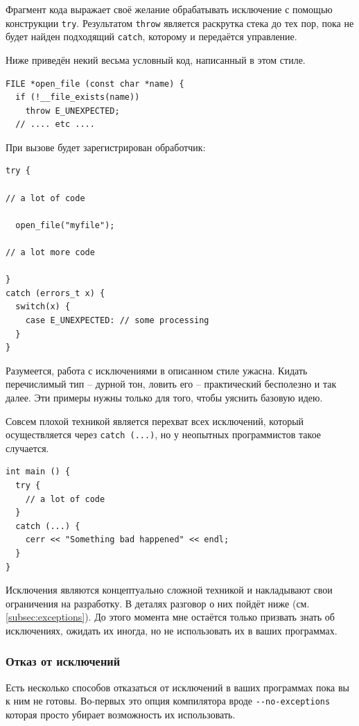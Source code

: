 \documentclass[a4paper,12pt,oneside]{article}
\begin{document}
Фрагмент кода выражает своё желание обрабатывать исключение с помощью конструкции \lstinline!try!. Результатом \lstinline!throw! является раскрутка стека до тех пор, пока не будет найден подходящий \lstinline!catch!, которому и передаётся управление.

Ниже приведён некий весьма условный код, написанный в этом стиле.

\begin{lstlisting}
FILE *open_file (const char *name) {
  if (!__file_exists(name))
    throw E_UNEXPECTED;
  // .... etc ....
\end{lstlisting}

При вызове будет зарегистрирован обработчик:

\begin{lstlisting}
try {

// a lot of code

  open_file("myfile");

// a lot more code

}
catch (errors_t x) {
  switch(x) {
    case E_UNEXPECTED: // some processing    
  }
}
\end{lstlisting}

Разумеется, работа с исключениями в описанном стиле ужасна. Кидать перечислимый тип -- дурной тон, ловить его -- практический бесполезно и так далее. Эти примеры нужны только для того, чтобы уяснить базовую идею.

Совсем плохой техникой является перехват всех исключений, который осуществляется через \lstinline!catch (...)!, но у неопытных программистов такое случается.

\begin{lstlisting}
int main () {
  try {
    // a lot of code
  }
  catch (...) {
    cerr << "Something bad happened" << endl;
  }
}
\end{lstlisting}

Исключения являются концептуально сложной техникой и накладывают свои ограничения на разработку. В деталях разговор о них пойдёт ниже (см. \ref{subsec:exceptions}). До этого момента мне остаётся только призвать знать об исключениях, ожидать их иногда, но не использовать их в ваших программах.

\subsubsection{Отказ от исключений}\label{subsub:basic_noexcept}

Есть несколько способов отказаться от исключений в ваших программах пока вы к ним не готовы. Во-первых это опция компилятора вроде \lstinline!--no-exceptions! которая просто убирает возможность их использовать.
\end{document}
